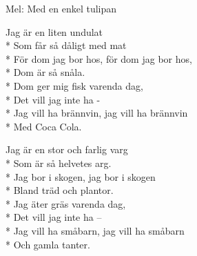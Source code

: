 \begin{SongText}[Undulaten]
    \begin{SongInfo}
        Mel: Med en enkel tulipan
    \end{SongInfo}
    \begin{SongVerse}
        Jag är en liten undulat\\*%
        Som får så dåligt med mat\\*%
        För dom jag bor hos, för dom jag bor hos,\\*%
        Dom är så snåla.\\*%
        Dom ger mig fisk varenda dag,\\*%
        Det vill jag inte ha -\\*%
        Jag vill ha brännvin, jag vill ha brännvin\\*%
        Med Coca Cola.
    \end{SongVerse}
    \begin{SongVerse}
        Jag är en stor och farlig varg\\*%
        Som är så helvetes arg.\\*%
        Jag bor i skogen, jag bor i skogen\\*%
        Bland träd och plantor.\\*%
        Jag äter gräs varenda dag,\\*%
        Det vill jag inte ha –\\*%
        Jag vill ha småbarn, jag vill ha småbarn\\*%
        Och gamla tanter.
    \end{SongVerse}
\end{SongText}
